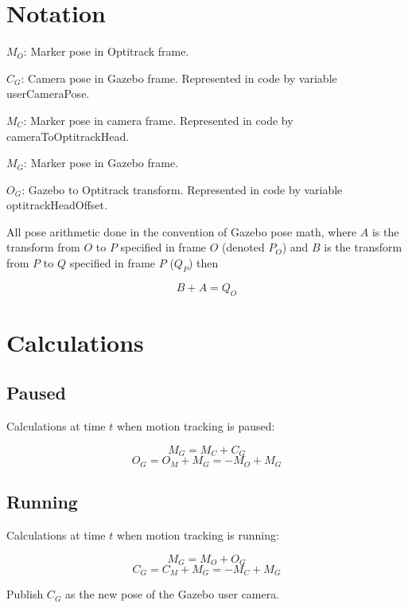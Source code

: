 \documentclass[11pt, letterpaper]{article}
\begin{document}
\section{Notation}
$M_O$: Marker pose in Optitrack frame.

$C_G$: Camera pose in Gazebo frame. Represented in code by variable userCameraPose.

$M_C$: Marker pose in camera frame. Represented in code by cameraToOptitrackHead.

$M_G$: Marker pose in Gazebo frame.

$O_G$: Gazebo to Optitrack transform. Represented in code by variable optitrackHeadOffset.

All pose arithmetic done in the convention of Gazebo pose math, where $A$ is
the transform from $O$ to $P$ specified in frame $O$ (denoted $P_O$) and $B$
is the transform from $P$ to $Q$ specified in frame $P$ ($Q_P$) then

\begin{equation}
B + A = Q_O
\end{equation}

\section{Calculations}
\subsection{Paused}
Calculations at time $t$ when motion tracking is paused:

\begin{equation}
M_G = M_C + C_G
\end{equation}
\begin{equation}
O_G = O_M + M_G = -M_O + M_G
\end{equation}

\subsection{Running}
Calculations at time $t$ when motion tracking is running:

\begin{equation}
M_G = M_O + O_G
\end{equation}
\begin{equation}
C_G = C_M + M_G = -M_C + M_G
\end{equation}

Publish $C_G$ as the new pose of the Gazebo user camera.
\end{document}
